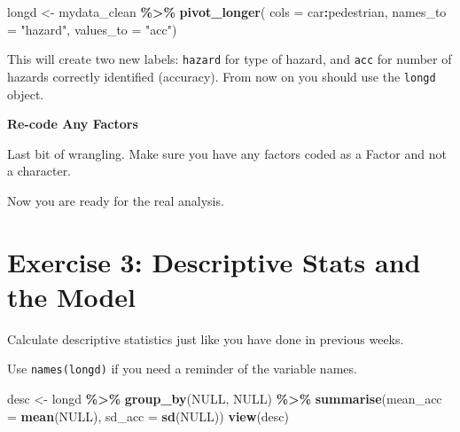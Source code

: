 \documentclass[
]{book}
\newenvironment{Shaded}{\begin{snugshade}}{\end{snugshade}}
\newcommand{\AttributeTok}[1]{\textcolor[rgb]{0.13,0.29,0.53}{#1}}
\newcommand{\ConstantTok}[1]{\textcolor[rgb]{0.56,0.35,0.01}{#1}}
\newcommand{\FunctionTok}[1]{\textcolor[rgb]{0.13,0.29,0.53}{\textbf{#1}}}
\newcommand{\NormalTok}[1]{#1}
\newcommand{\OtherTok}[1]{\textcolor[rgb]{0.56,0.35,0.01}{#1}}
\newcommand{\SpecialCharTok}[1]{\textcolor[rgb]{0.81,0.36,0.00}{\textbf{#1}}}
\newcommand{\StringTok}[1]{\textcolor[rgb]{0.31,0.60,0.02}{#1}}
\let\oldsection\section
\renewcommand{\section}{\needspace{5\baselineskip}\oldsection}
\begin{document}
\begin{Shaded}
\begin{Highlighting}[]
\NormalTok{longd }\OtherTok{\textless{}{-}}\NormalTok{ mydata\_clean }\SpecialCharTok{\%\textgreater{}\%}
  \FunctionTok{pivot\_longer}\NormalTok{(}
    \AttributeTok{cols =}\NormalTok{ car}\SpecialCharTok{:}\NormalTok{pedestrian,}
    \AttributeTok{names\_to =} \StringTok{"hazard"}\NormalTok{,}
    \AttributeTok{values\_to =} \StringTok{"acc"}\NormalTok{)}
\end{Highlighting}
\end{Shaded}

This will create two new labels: \texttt{hazard} for type of hazard, and \texttt{acc} for number of hazards correctly identified (accuracy). From now on you should use the \texttt{longd} object.

\textbf{Re-code Any Factors}

Last bit of wrangling. Make sure you have any factors coded as a Factor and not a character.

\begin{Shaded}
\end{Shaded}

Now you are ready for the real analysis.

\section{Exercise 3: Descriptive Stats and the Model}\label{exercise-3-descriptive-stats-and-the-model}

Calculate descriptive statistics just like you have done in previous weeks.

Use \texttt{names(longd)} if you need a reminder of the variable names.

\begin{Shaded}
\begin{Highlighting}[]
\NormalTok{desc }\OtherTok{\textless{}{-}}\NormalTok{ longd }\SpecialCharTok{\%\textgreater{}\%}
  \FunctionTok{group\_by}\NormalTok{(}\ConstantTok{NULL}\NormalTok{, }\ConstantTok{NULL}\NormalTok{) }\SpecialCharTok{\%\textgreater{}\%}
    \FunctionTok{summarise}\NormalTok{(}\AttributeTok{mean\_acc =} \FunctionTok{mean}\NormalTok{(}\ConstantTok{NULL}\NormalTok{),}
              \AttributeTok{sd\_acc =} \FunctionTok{sd}\NormalTok{(}\ConstantTok{NULL}\NormalTok{))}
\FunctionTok{view}\NormalTok{(desc)}
\end{Highlighting}
\end{Shaded}
\end{document}
